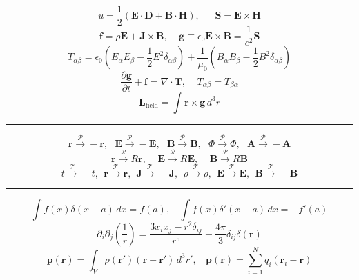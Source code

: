 \documentclass[twocolumn]{article}
\newcommand{\0}{\textcolor{gray}{0}}
\newcommand{\di}{\nabla\cdot}
\newcommand{\rv}{\mathbf{r}}
\newcommand{\eo}{\epsilon_{0}}
\newcommand{\uo}{\mu_{0}}
\newcommand{\rdif}{\rv - \rv'}
\newcommand{\pd}[2]{\dfrac{\partial #1}{\partial #2}}
\newcommand{\n}[1]{\mathbf{#1}}
\begin{document}
\begin{equation*}
	u = \frac{1}{2}\left(\n{E}\cdot\n{D} + \n{B}\cdot\n{H}\right), ~~~~~~~ \n{S} = \n{E}\times\n{H}
\end{equation*}
\begin{equation*}
	\n{f} = \rho\n{E} + \n{J}\times\n{B}, ~~~~~ \n{g} \equiv \eo \n{E}\times\n{B} = \frac{1}{c^2} \n{S}
\end{equation*}
\begin{equation*}
T_{\alpha\beta} = \eo\left(E_{\alpha} E_{\beta} - \frac{1}{2}E^2 \delta_{\alpha\beta}\right) + \frac{1}{\uo} \left(B_{\alpha}B_{\beta} - \frac{1}{2}B^2\delta_{\alpha\beta} \right)
\end{equation*}
\begin{equation*}
	\pd{\n{g}}{t} + \n{f} = \di\n{T}, ~~~~~ T_{\alpha\beta} = T_{\beta\alpha}
\end{equation*}
\begin{equation*}
	\n{L}_{\mathrm{field}} = \int \n{r}\times\n{g} \, d^3 r
\end{equation*}
\hrule\vspace{1mm}
\begin{equation*}
	\n{r} \xrightarrow{\mathcal{P}} -\n{r}, ~~~ \n{E} \xrightarrow{\mathcal{P}} -\n{E}, ~~~ \n{B} \xrightarrow{\mathcal{P}} \n{B}, ~~~ \Phi \xrightarrow{\mathcal{P}} \Phi, ~~~ \n{A} \xrightarrow{\mathcal{P}} -\n{A}
\end{equation*}
\begin{equation*}
	\n{r} \xrightarrow{\mathcal{R}} R\n{r}, ~~~~~ \n{E} \xrightarrow{\mathcal{R}} R\n{E}, ~~~~~ \n{B} \xrightarrow{\mathcal{R}} R\n{B}
\end{equation*}
\begin{equation*}
	t \xrightarrow{\mathcal{T}} -t, ~~ \rv \xrightarrow{\mathcal{T}} \rv, ~~ \n{J} \xrightarrow{\mathcal{T}} -\n{J}, ~~ \rho \xrightarrow{\mathcal{T}} \rho, ~~ \n{E} \xrightarrow{\mathcal{T}} \n{E}, ~~ \n{B} \xrightarrow{\mathcal{T}} -\n{B}
\end{equation*}
\hrule\vspace{1mm}
\begin{equation*}
	\int f(x) \delta(x-a) \, dx = f(a), ~~~~ \int f(x) \delta'(x-a) \, dx = - f'(a)
\end{equation*}
\begin{equation*}
	\partial_{i}\partial_{j}\left(\frac{1}{r}\right) = \frac{3 x_{i} x_{j} - r^2 \delta_{ij}}{r^5} - \frac{4\pi}{3} \delta_{ij} \delta(\rv)
\end{equation*}
\begin{equation*}
	\n{p}(\rv) = \int_{V}\rho(\rv') (\rdif)\, d^3 r', ~~~~ \n{p}(\rv) = \sum_{i=1}^{N} q_{i}(\rv_{i} - \rv)
\end{equation*}
\end{document}
